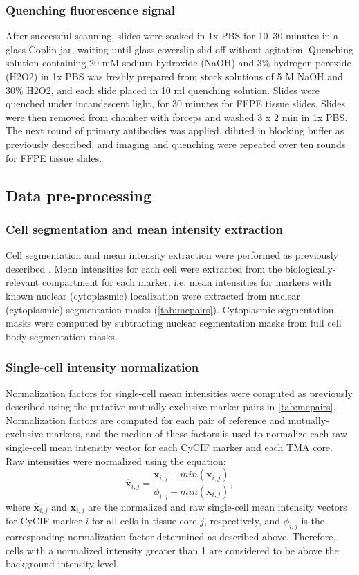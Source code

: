 \documentclass[preprint,review,3p,12pt]{elsarticle}
\begin{document}
\subsubsection{Quenching fluorescence signal}
After successful scanning, slides were soaked in 1x PBS for 10–30 minutes in a glass Coplin jar, waiting until glass coverslip slid off without agitation. Quenching solution containing 20 mM sodium hydroxide (NaOH) and 3\% hydrogen peroxide (H2O2) in 1x PBS was freshly prepared from stock solutions of 5 M NaOH and 30\% H2O2, and each slide placed in 10 ml quenching solution. Slides were quenched under incandescent light, for 30 minutes for FFPE tissue slides. Slides were then removed from chamber with forceps and washed 3 x 2 min in 1x PBS. The next round of primary antibodies was applied, diluted in blocking buffer as previously described, and imaging and quenching were repeated over ten rounds for FFPE tissue slides.


\subsection{Data pre-processing}
\subsubsection{Cell segmentation and mean intensity extraction}
Cell segmentation and mean intensity extraction were performed as previously described \cite{cmif2020}. Mean intensities for each cell were extracted from the biologically-relevant compartment for each marker, i.e. mean intensities for markers with known nuclear (cytoplasmic) localization were extracted from nuclear (cytoplasmic) segmentation masks (\autoref{tab:mepairs}). Cytoplasmic segmentation masks were computed by subtracting nuclear segmentation masks from full cell body segmentation masks.

\subsubsection{Single-cell intensity normalization} \label{restore}
Normalization factors for single-cell mean intensities were computed as previously described \cite{Chang2020} using the putative mutually-exclusive marker pairs in \autoref{tab:mepairs}. Normalization factors are computed for each pair of reference and mutually-exclusive markers, and the median of these factors is used to normalize each raw single-cell mean intensity vector for each CyCIF marker and each TMA core. Raw intensities were normalized using the equation:
\begin{equation}
\label{eq:norm}
\hat{\mathbf{x}}_{i,j} = \frac{\mathbf{x}_{i,j}-min(\mathbf{x}_{i,j})}{\phi_{i,j}-min(\mathbf{x}_{i,j})},
\end{equation}
where $\hat{\mathbf{x}}_{i,j}$ and $\mathbf{x}_{i,j}$ are the normalized and raw single-cell mean intensity vectors for CyCIF marker $i$ for all cells in tissue core $j$, respectively, and $\phi_{i,j}$ is the corresponding normalization factor determined as described above. Therefore, cells with a normalized intensity greater than 1 are considered to be above the background intensity level.
\end{document}
